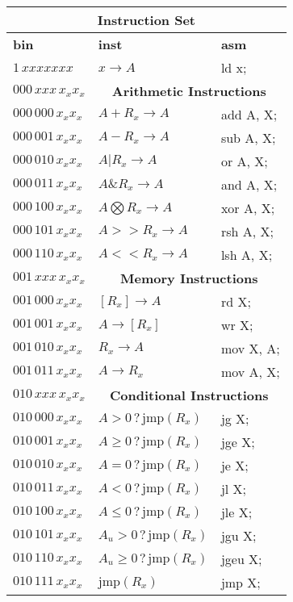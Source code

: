 \documentclass[11pt]{article}
\begin{document}
\begin{tabular}{|l | l | l |}
\hline
\multicolumn{3}{|c|}{ \textbf{Instruction Set}} \\
\hline
\textbf{bin} & \textbf{inst} & \textbf{asm}\\
\hline 
$1\,xxxxxxx$ & $x \rightarrow A$ & ld x;  \\
\hline
$000\,xxx\,x_x x_x$&\multicolumn{2}{c|}{ \textbf{Arithmetic Instructions}} \\
\hline
$000\,000\,x_x x_x$ & $A + R_x \rightarrow A$ & add A, X; \\
$000\,001\,x_x x_x$ & $A - R_x \rightarrow A$ & sub A, X; \\
$000\,010\,x_x x_x$ & $A | R_x \rightarrow A$ & or A, X; \\
$000\,011\, x_x x_x$ & $A \& R_x \rightarrow A$ & and A, X; \\
$000\,100\, x_x x_x$ & $A \bigotimes R_x \rightarrow A$ & xor A, X; \\
$000\,101\, x_x x_x$ & $A >> R_x \rightarrow A$ & rsh A, X; \\
$000\,110\, x_x x_x$ & $A << R_x \rightarrow A$ & lsh A, X; \\
\hline
$001\,xxx\,x_x x_x$&\multicolumn{2}{c|}{ \textbf{Memory Instructions}} \\
\hline
$001\,000\, x_x x_x$ & $[R_x] \rightarrow A$ & rd X; \\
$001\,001\, x_x x_x$ & $A \rightarrow [R_x]$ & wr X; \\
$001\,010\, x_x x_x$ & $R_x \rightarrow A$ & mov X, A; \\
$001\,011\, x_x x_x$ & $A \rightarrow R_x$ & mov A, X; \\
\hline
$010\,xxx\,x_x x_x$&\multicolumn{2}{c|}{ \textbf{Conditional Instructions}} \\
\hline
$010\,000\, x_x x_x$ & $A > 0 \,?\, \mathrm{jmp}(R_x)$ & jg X; \\
$010\,001\, x_x x_x$ & $A \geq 0 \,?\, \mathrm{jmp}(R_x)$ & jge X; \\
$010\,010\, x_x x_x$ & $A = 0 \,?\, \mathrm{jmp}(R_x)$ & je X; \\
$010\,011\, x_x x_x$ & $A < 0 \,?\, \mathrm{jmp}(R_x)$ & jl X; \\
$010\,100\, x_x x_x$ & $A \leq 0 \,?\, \mathrm{jmp}(R_x)$ & jle X; \\
$010\,101\, x_x x_x$ & $A_u > 0 \,?\, \mathrm{jmp}(R_x)$ & jgu X; \\
$010\,110\, x_x x_x$ & $A_u \geq 0 \,?\, \mathrm{jmp}(R_x)$ & jgeu X; \\
$010\,111\, x_x x_x$ & $\mathrm{jmp}(R_x)$ & jmp X; \\
\hline
\end{tabular}
\end{document}
